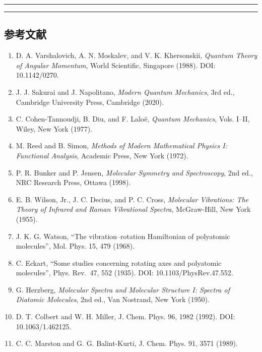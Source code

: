 \documentclass[
]{ctexbook}
\providecommand{\tightlist}{%
  \setlength{\itemsep}{0pt}\setlength{\parskip}{0pt}}
\let\origsubsection\subsection
\renewcommand{\subsection}[1]{%
  \needspace{6\baselineskip}%
  \origsubsection{#1}%
}
\begin{document}
\begin{center}\rule{0.5\linewidth}{0.5pt}\end{center}

\begin{center}\rule{0.5\linewidth}{0.5pt}\end{center}

\hypertarget{ux53c2ux8003ux6587ux732e}{%
\subsection{参考文献}\label{ux53c2ux8003ux6587ux732e}}

\begin{enumerate}
\def\labelenumi{\arabic{enumi}.}
\tightlist
\item
  D. A. Varshalovich, A. N. Moskalev, and V. K. Khersonskii,
  \emph{Quantum Theory of Angular Momentum}, World Scientific, Singapore
  (1988). DOI: 10.1142/0270.
\item
  J. J. Sakurai and J. Napolitano, \emph{Modern Quantum Mechanics}, 3rd
  ed., Cambridge University Press, Cambridge (2020).
\item
  C. Cohen-Tannoudji, B. Diu, and F. Laloë, \emph{Quantum Mechanics},
  Vols. I--II, Wiley, New York (1977).
\item
  M. Reed and B. Simon, \emph{Methods of Modern Mathematical Physics I:
  Functional Analysis}, Academic Press, New York (1972).
\item
  P. R. Bunker and P. Jensen, \emph{Molecular Symmetry and
  Spectroscopy}, 2nd ed., NRC Research Press, Ottawa (1998).
\item
  E. B. Wilson, Jr., J. C. Decius, and P. C. Cross, \emph{Molecular
  Vibrations: The Theory of Infrared and Raman Vibrational Spectra},
  McGraw-Hill, New York (1955).
\item
  J. K. G. Watson, ``The vibration--rotation Hamiltonian of polyatomic
  molecules'', Mol. Phys. 15, 479 (1968).
\item
  C. Eckart, ``Some studies concerning rotating axes and polyatomic
  molecules'', Phys. Rev.~47, 552 (1935). DOI: 10.1103/PhysRev.47.552.
\item
  G. Herzberg, \emph{Molecular Spectra and Molecular Structure I:
  Spectra of Diatomic Molecules}, 2nd ed., Van Nostrand, New York
  (1950).
\item
  D. T. Colbert and W. H. Miller, J. Chem. Phys. 96, 1982 (1992). DOI:
  10.1063/1.462125.
\item
  C. C. Marston and G. G. Balint-Kurti, J. Chem. Phys. 91, 3571 (1989).

\end{enumerate}
\end{document}
